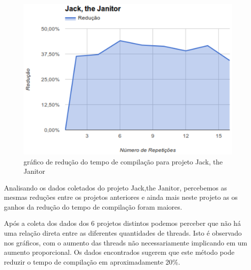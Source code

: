 \begin{figure}[h]
    \centering
        \includegraphics[keepaspectratio=true,scale=1]{figuras/jack.eps}
    \caption{gráfico de redução do tempo de compilação para projeto Jack, the Janitor}
    \label{jack}
\end{figure}

Analisando os dados coletados do projeto Jack,the Janitor,
 percebemos as mesmas reduções entre os projetos anteriores
 e ainda mais neste projeto as os ganhos da redução do
 tempo de compilação foram maiores.

Após a coleta dos dados dos 6 projetos distintos podemos
 perceber que não há uma relação direta entre as diferentes
 quantidades de threads. Isto é observado nos gráficos,
 com o aumento das threads não necessariamente implicando
 em um aumento proporcional. Os dados encontrados
 sugerem que este método pode reduzir o tempo de
 compilação em aproximadamente 20\%.
